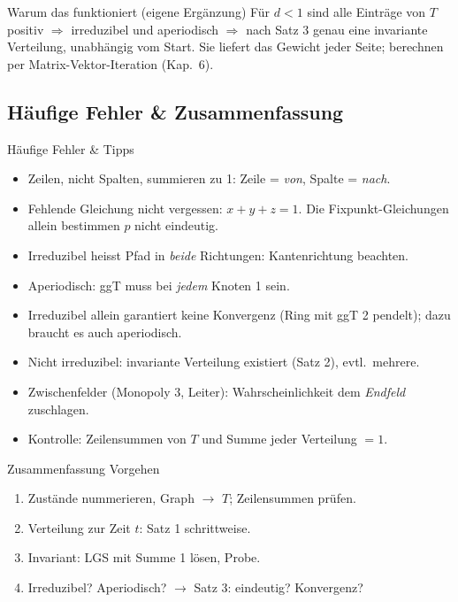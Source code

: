\documentclass[a4paper, fontsize=7pt]{scrartcl}
\begin{document}
\begin{subbox}{Warum das funktioniert (eigene Ergänzung)}
Für $d < 1$ sind alle Einträge von $T$ positiv $\Rightarrow$ irreduzibel und
aperiodisch $\Rightarrow$ nach Satz 3 genau eine invariante Verteilung, unabhängig vom
Start. Sie liefert das Gewicht jeder Seite; berechnen per Matrix-Vektor-Iteration
(Kap.\ 6).
\end{subbox}

\subsection{Häufige Fehler \& Zusammenfassung}

\begin{subbox}{Häufige Fehler \& Tipps}
\begin{itemize}
    \item Zeilen, nicht Spalten, summieren zu 1: Zeile = \emph{von}, Spalte = \emph{nach}.
    \item Fehlende Gleichung nicht vergessen: $x + y + z = 1$. Die Fixpunkt-Gleichungen
          allein bestimmen $p$ nicht eindeutig.
    \item Irreduzibel heisst Pfad in \emph{beide} Richtungen: Kantenrichtung beachten.
    \item Aperiodisch: ggT muss bei \emph{jedem} Knoten 1 sein.
    \item Irreduzibel allein garantiert keine Konvergenz (Ring mit ggT 2 pendelt);
          dazu braucht es auch aperiodisch.
    \item Nicht irreduzibel: invariante Verteilung existiert (Satz 2), evtl.\ mehrere.
    \item Zwischenfelder (Monopoly 3, Leiter): Wahrscheinlichkeit dem \emph{Endfeld}
          zuschlagen.
    \item Kontrolle: Zeilensummen von $T$ und Summe jeder Verteilung $= 1$.
\end{itemize}
\end{subbox}

\begin{subbox}{Zusammenfassung Vorgehen}
\begin{enumerate}
    \item Zustände nummerieren, Graph $\to$ $T$; Zeilensummen prüfen.
    \item Verteilung zur Zeit $t$: Satz 1 schrittweise.
    \item Invariant: LGS mit Summe 1 lösen, Probe.
    \item Irreduzibel? Aperiodisch? $\to$ Satz 3: eindeutig? Konvergenz?
\end{enumerate}
\end{subbox}
\end{document}
